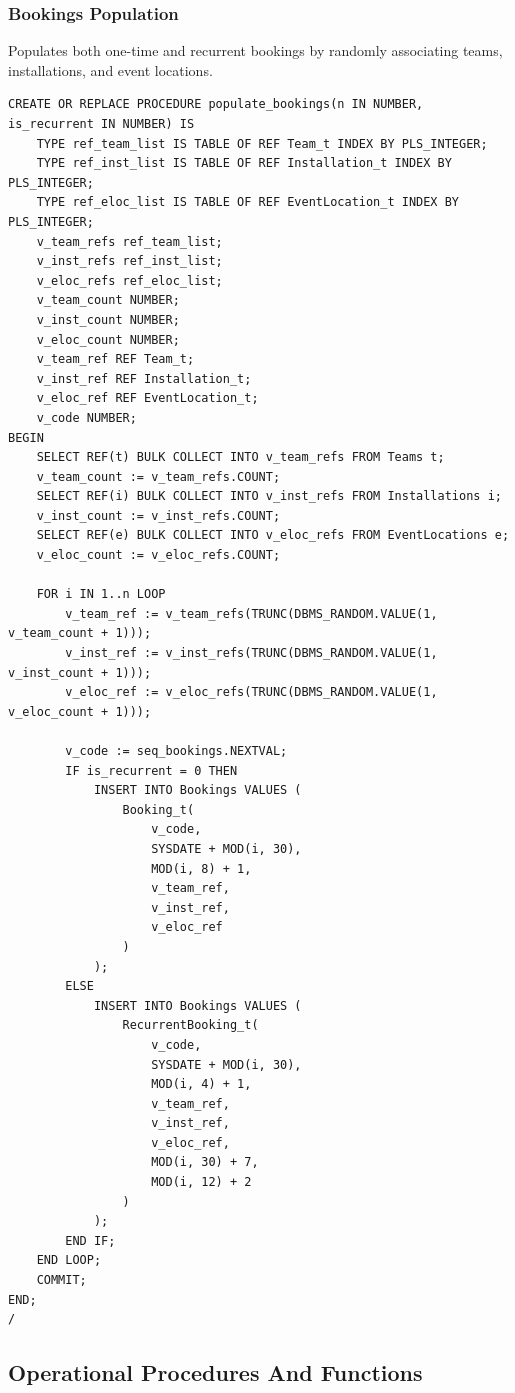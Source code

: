 \subsubsection{Bookings Population}
Populates both one-time and recurrent bookings by randomly associating teams, installations, and event locations.

\begin{verbatim}
CREATE OR REPLACE PROCEDURE populate_bookings(n IN NUMBER, is_recurrent IN NUMBER) IS
    TYPE ref_team_list IS TABLE OF REF Team_t INDEX BY PLS_INTEGER;
    TYPE ref_inst_list IS TABLE OF REF Installation_t INDEX BY PLS_INTEGER;
    TYPE ref_eloc_list IS TABLE OF REF EventLocation_t INDEX BY PLS_INTEGER;
    v_team_refs ref_team_list;
    v_inst_refs ref_inst_list;
    v_eloc_refs ref_eloc_list;
    v_team_count NUMBER;
    v_inst_count NUMBER;
    v_eloc_count NUMBER;
    v_team_ref REF Team_t;
    v_inst_ref REF Installation_t;
    v_eloc_ref REF EventLocation_t;
    v_code NUMBER;
BEGIN
    SELECT REF(t) BULK COLLECT INTO v_team_refs FROM Teams t;
    v_team_count := v_team_refs.COUNT;
    SELECT REF(i) BULK COLLECT INTO v_inst_refs FROM Installations i;
    v_inst_count := v_inst_refs.COUNT;
    SELECT REF(e) BULK COLLECT INTO v_eloc_refs FROM EventLocations e;
    v_eloc_count := v_eloc_refs.COUNT;

    FOR i IN 1..n LOOP
        v_team_ref := v_team_refs(TRUNC(DBMS_RANDOM.VALUE(1, v_team_count + 1)));
        v_inst_ref := v_inst_refs(TRUNC(DBMS_RANDOM.VALUE(1, v_inst_count + 1)));
        v_eloc_ref := v_eloc_refs(TRUNC(DBMS_RANDOM.VALUE(1, v_eloc_count + 1)));

        v_code := seq_bookings.NEXTVAL;
        IF is_recurrent = 0 THEN
            INSERT INTO Bookings VALUES (
                Booking_t(
                    v_code,
                    SYSDATE + MOD(i, 30),
                    MOD(i, 8) + 1,
                    v_team_ref,
                    v_inst_ref,
                    v_eloc_ref
                )
            );
        ELSE
            INSERT INTO Bookings VALUES (
                RecurrentBooking_t(
                    v_code,
                    SYSDATE + MOD(i, 30),
                    MOD(i, 4) + 1,
                    v_team_ref,
                    v_inst_ref,
                    v_eloc_ref,
                    MOD(i, 30) + 7,
                    MOD(i, 12) + 2
                )
            );
        END IF;
    END LOOP;
    COMMIT;
END;
/
\end{verbatim}

\subsection{Operational Procedures And Functions}


